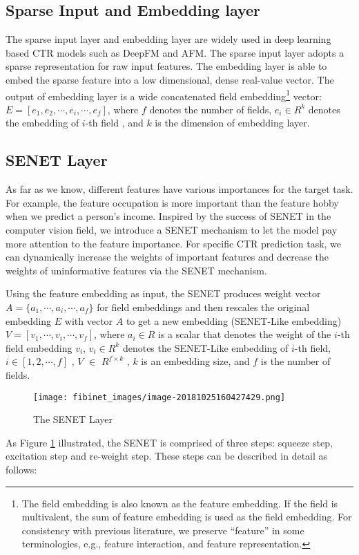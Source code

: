 \documentclass[sigconf]{acmart}
\begin{document}
\subsection{Sparse Input and Embedding
layer}
The sparse input layer and embedding layer are widely used in
deep learning based CTR models such as DeepFM\cite{guo2017deepfm} and AFM\cite{xiao2017attentional}.
The sparse input layer adopts a sparse representation for raw input
features. The embedding layer is able to embed the sparse feature into a
low dimensional, dense real-value vector. The output of embedding layer
is a wide concatenated field embedding\footnote{The field embedding is
  also known as the feature embedding. If the field is multivalent, the
  sum of feature embedding is used as the field embedding. For
  consistency with previous literature, we preserve ``feature'' in some
  terminologies, e.g., feature interaction, and feature representation.}
vector: \(E=[e_1, e_2, \cdots,e_i, \cdots, e_f]\), where \(f\) denotes
the number of fields, \(e _i \in R^k\) denotes the embedding of \(i\)-th
field , and \(k\) is the dimension of embedding layer.

\subsection{SENET Layer}
As far as we know, different features have various importances for the target task. For
example, the feature occupation is more important than the feature hobby
when we predict a person's income. Inspired by the success of SENET in
the computer vision field, we introduce a SENET mechanism to let the model pay more attention to the feature importance. For specific CTR prediction task, we can
dynamically increase the weights of important features and decrease the
weights of uninformative features via the SENET mechanism.

Using the feature embedding as input, the SENET produces weight vector $A=\{a_1,\cdots,a_i,\cdots,a_f\}$ for field
embeddings and then rescales the original embedding $E$ with vector $A$ to get a new embedding (SENET-Like embedding) $V=[v_1,\cdots, v_i,\cdots,v_f]$, where $a_i \in R$
is a scalar that denotes the weight of the \(i\)-th field
embedding $v_i$, $v_i \in R^k$ denotes the SENET-Like
embedding of \(i\)-th field, \(i \in [1,2,\cdots,f]\) , \(V\) \(\in\)
\(R^{f \times k}\) , \(k\) is an embedding size, and \(f\) is the number
of fields.

\begin{figure}
\centering
\texttt{[image: fibinet\_images/image-20181025160427429.png]}
\caption{The SENET Layer}
\label{fig:f2}
\end{figure}
As Figure \ref{fig:f2} illustrated, the SENET is comprised of three steps: squeeze step, excitation step and re-weight step. These steps can be described in detail as follows:
\end{document}
